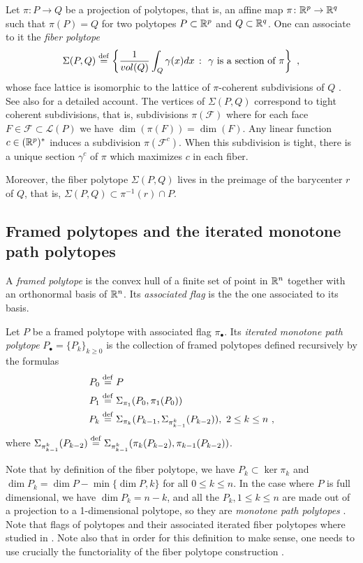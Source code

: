 Let $\pi \colon P \to Q$ be a projection of polytopes, that is, an affine map $\pi \colon \mathbb{R}^p \to \mathbb{R}^q$ such that $\pi(P)=Q$ for two polytopes $P\subset \mathbb{R}^p$ and $Q \subset \mathbb{R}^q$.
One can associate to it the \emph{fiber polytope} \[\Sigma(P,Q) \stackrel{\mathrm{def}}{=} \left\{ \frac{1}{vol(Q)}\int_Q \gamma(x)dx \ \colon \ \gamma \text{ is a section of }\pi \right\} \ , \] whose face lattice is isomorphic to the lattice of $\pi$-coherent subdivisions of $Q$ \cite{BilleraSturmfels92}.
See also \cite[Chapter 9]{Ziegler95} for a detailed account.
The vertices of $\Sigma(P,Q)$ correspond to tight coherent subdivisions, that is, subdivisions $\pi(\mathcal{F})$ where for each face $F \in \mathcal{F}\subset\mathcal{L}(P)$ we have $\dim(\pi(F))=\dim(F)$.
Any linear function $c\in (\mathbb{R}^p)^{*}$ induces a subdivision $\pi(\mathcal{F}^c)$.
When this subdivision is tight, there is a unique section $\gamma^c$ of $\pi$ which maximizes $c$ in each fiber.

Moreover, the fiber polytope $\Sigma(P,Q)$ lives in the preimage of the barycenter $r$ of $Q$, that is, $\Sigma(P,Q)\subset\pi^{-1}(r)\cap P$.

\subsection{Framed polytopes and the iterated monotone path polytopes}

A \textit{framed polytope} is the convex hull of a finite set of point in $\mathbb{R}^n$ together with an orthonormal basis of $\mathbb{R}^n$.
Its \textit{associated flag} is the the one associated to its basis.

\begin{definition}
	Let $P$ be a framed polytope with associated flag $\pi_\bullet$.
	Its \textit{iterated monotone path polytope} $P_\bullet = \{P_k\}_{k \geq 0}$ is the collection of framed polytopes defined recursively by the formulas
	\begin{align*}
		P_0 & \stackrel{\mathrm{def}}{=} P \\
		P_1 & \stackrel{\mathrm{def}}{=} \Sigma_{\pi_1}(P_0,\pi_1(P_0)) \\
		P_k & \stackrel{\mathrm{def}}{=} \Sigma_{\pi_k}(P_{k-1},\Sigma_{\pi^{k}_{k-1}}(P_{k-2})), \ 2 \leq k \leq n \ ,
	\end{align*}
	where $\Sigma_{\pi^{k}_{k-1}}(P_{k-2})\stackrel{\mathrm{def}}{=} \Sigma_{\pi^{k}_{k-1}}(\pi_k(P_{k-2}),\pi_{k-1}(P_{k-2}))$.
\end{definition}

Note that by definition of the fiber polytope, we have $P_k \subset \ker \pi_k$ and $\dim P_k = \dim P - \min\{ \dim P,k\}$ for all $0\leq k \leq n$.
In the case where $P$ is full dimensional, we have $\dim P_k = n-k$, and all the $P_k, 1 \leq k \leq n$ are made out of a projection to a 1-dimensional polytope, so they are \emph{monotone path polytopes} \cite[Theorem 5.3]{BilleraSturmfels92}.
Note that flags of polytopes and their associated iterated fiber polytopes where studied in \cite{BilleraSturmfels94}.
Note also that in order for this definition to make sense, one needs to use crucially the functoriality of the fiber polytope construction \cite[Lemma 2.3]{BilleraSturmfels92}.

